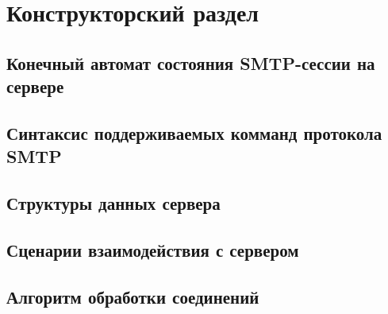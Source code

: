 \chapter{Конструкторский раздел}
\label{cha:design}

\section{Конечный автомат состояния SMTP-сессии на сервере}

\section{Синтаксис поддерживаемых комманд протокола SMTP}

\section{Структуры данных сервера}

\section{Сценарии взаимодействия с сервером}

\section{Алгоритм обработки соединений}
